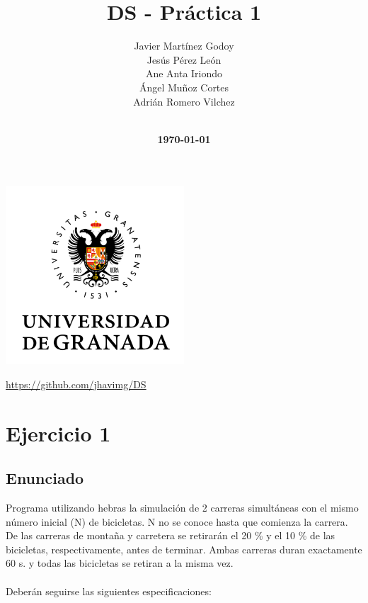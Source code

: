 \documentclass{article} %
\title{\textbf{DS - Práctica 1}} %
\author{Javier Martínez Godoy \\ Jesús Pérez León \\ Ane Anta Iriondo\\ Ángel Muñoz Cortes \\ Adrián Romero Vilchez \\ \\} %
\date{\textbf{\today}} %
\begin{document}
    \maketitle
    \begin{center}
        \includegraphics[width=0.5\textwidth]{imagenes/ugr.png}
    \end{center}

    \href{link}{https://github.com/jhavimg/DS}

    \newpage

    \tableofcontents

    \newpage

    \section{Ejercicio 1}
    \subsection{Enunciado}
    \hspace*{1cm}Programa utilizando hebras la simulación de 2 carreras simultáneas con el mismo número
                    inicial (N) de bicicletas. N no se conoce hasta que comienza la carrera. De las carreras de
                    montaña y carretera se retirarán el 20 \% y el 10 \% de las bicicletas, respectivamente, antes
                    de terminar. Ambas carreras duran exactamente 60 s. y todas las bicicletas se retiran a la
                    misma vez. \\ \\
    \hspace*{1cm}Deberán seguirse las siguientes especificaciones:
\end{document}
